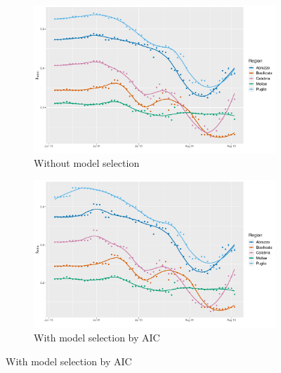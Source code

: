 \documentclass[12pt]{article}
\begin{document}
\begin{appendices}
		\begin{figure}[H]
    	    \centering
    	    \begin{subfigure}{\textwidth}
    	      \centering
    	      \includegraphics[width=0.92\linewidth]{output/model_within_lag14_betawithin_Sud_rolling.pdf}
    	      \caption{Without model selection}
    	      \label{fig:beta_within_over_time_sud_regular}
    	    \end{subfigure}\newline
    	    \begin{subfigure}{\textwidth}
    	      \centering
    	      \includegraphics[width=0.92\linewidth]{output/model_within_lag14_betawithin_Sud_aic_rolling.pdf}
    	      \caption{With model selection by AIC}
    	      \label{fig:beta_within_over_time_sud_aic}
    	    \end{subfigure}
    	\end{figure}
        \begin{figure}[H]\ContinuedFloat
    	    \begin{subfigure}{\textwidth}
    	      \centering

\end{subfigure}
\end{figure}
\end{appendices}
\end{document}
